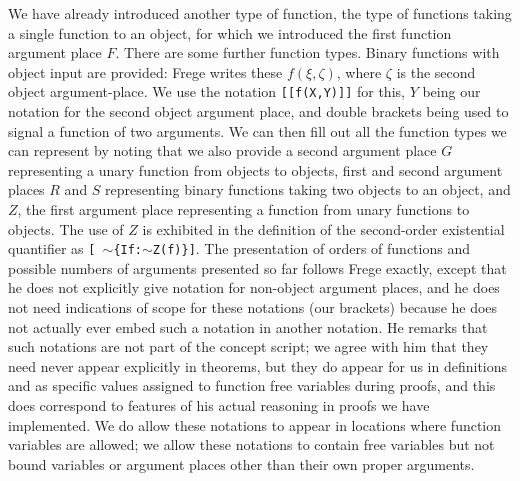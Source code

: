 \documentclass{article}
\begin{document}
We have already introduced another type of function, the type of functions taking a single function to an object, for which we introduced the first function argument place $F$.  There are some further function types.  Binary functions with object input are provided:  Frege writes these $f(\xi,\zeta)$, where $\zeta$ is the second object argument-place.  We use the notation
{\tt [[f(X,Y)]]} for this, $Y$ being our notation for the second object argument place, and double brackets being used to signal a function of two arguments.  We can then fill out
all the function types we can represent by noting that we also provide a second argument place $G$ representing a unary function from objects to objects, first and second
argument places $R$ and $S$ representing binary functions taking two objects to an object, and $Z$, the first argument place representing a function from unary functions to objects.
The use of $Z$ is exhibited in the definition of the second-order existential quantifier as {\tt[ $\sim$\{If:$\sim$Z(f)\}]}.  The presentation of orders of functions and possible numbers
of arguments presented so far follows Frege exactly, except that he does not explicitly give notation for non-object argument places, and he does not need indications of scope for these notations (our brackets) because he does not actually ever embed such a notation in another notation.  He remarks that such notations are not part of the concept script;  we agree with him that they need never appear explicitly in theorems, but they do appear for us in definitions and as specific values assigned to function free variables during proofs, and this does correspond to features of  his actual reasoning in proofs we have implemented.  We do allow these notations to appear in locations where function variables are allowed;  we allow these notations to contain free variables but not bound variables or argument places other than their own proper arguments.
\end{document}
